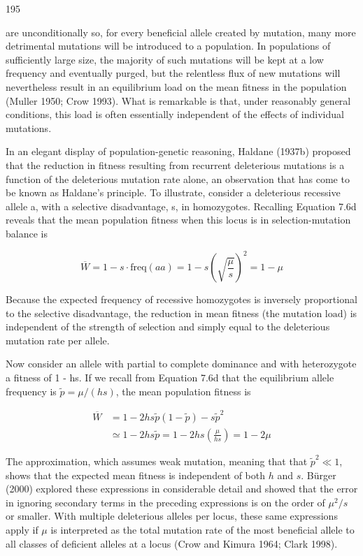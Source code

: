 \documentclass{article}
\begin{document}
195

are unconditionally so, for every beneficial allele created by mutation, many more detrimental mutations will be introduced to a population. In populations of sufficiently large size, the majority of such mutations will be kept at a low frequency and eventually purged, but the relentless flux of new mutations will nevertheless result in an equilibrium load on the mean fitness in the population (Muller 1950; Crow 1993). What is remarkable is that, under reasonably general conditions, this load is often essentially independent of the effects of individual mutations.

In an elegant display of population-genetic reasoning, Haldane (1937b) proposed that the reduction in fitness resulting from recurrent deleterious mutations is a function of the deleterious mutation rate alone, an observation that has come to be known as Haldane's principle. To illustrate, consider a deleterious recessive allele a, with a selective disadvantage, s, in homozygotes. Recalling Equation 7.6d reveals that the mean population fitness when this locus is in selection-mutation balance is

\begin{equation}
\overline{W}=1-s\cdot\mathrm{f r e q}(a a)=1-s\left(\sqrt{\frac{\mu}{s}}\right)^{2}=1-\mu
\tag{7.40a}
\label{eq:7_40a}
\end{equation}

Because the expected frequency of recessive homozygotes is inversely proportional to the selective disadvantage, the reduction in mean fitness (the  $ \text{mutation load} $) is independent of the strength of selection and simply equal to the deleterious mutation rate per allele.

Now consider an allele with partial to complete dominance and with heterozygote a fitness of 1 - hs. If we recall from Equation 7.6d that the equilibrium allele frequency is  $ \widetilde{p} = \mu / (hs) $, the mean population fitness is

\begin{equation}
\begin{align*}\overline{W}&=1-2hs\widetilde{p}(1-\widetilde{p})-s\widetilde{p}^2\\&\simeq1-2hs\widetilde{p}=1-2hs\left(\frac{\mu}{hs}\right)=1-2\mu\end{align*}
\tag{7.40b}
\label{eq:7_40b}
\end{equation}

The approximation, which assumes weak mutation, meaning that that  $ \tilde{p}^2 \ll 1 $, shows that the expected mean fitness is independent of both  $ h $ and  $ s $. Bürger (2000) explored these expressions in considerable detail and showed that the error in ignoring secondary terms in the preceding expressions is on the order of  $ \mu^2/s $ or smaller. With multiple deleterious alleles per locus, these same expressions apply if  $ \mu $ is interpreted as the total mutation rate of the most beneficial allele to all classes of deficient alleles at a locus (Crow and Kimura 1964; Clark 1998).
\end{document}
